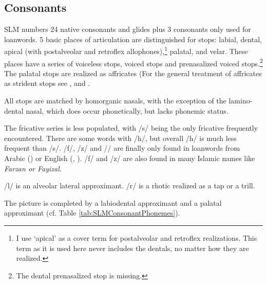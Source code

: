 
\subsection{Consonants}\label{sec:phon:Consonants}
SLM numbers 24 native consonants and glides plus 3 consonants only used for loanwords. 5 basic places of articulation are distinguished for stops: labial, dental, apical (with postalveolar and retroflex allophones),\footnote{I use `apical' as a cover term for  postalveolar and retroflex realizations. This term as it is used here never includes the dentals, no matter how they are realized.} palatal, and velar. These places have a series of voiceless stops, voiced stops and prenasalized voiced stops.\footnote{The dental prenasalized stop is missing.} The palatal stops are realized as affricates (For the general treatment of affricates as strident stops see \citet{JakobsonEtAl1952speechanalysis,Clements1999affr}, and \citet{Kehrein2002affr}.

All stops are matched by homorganic nasals, with the exception of the lamino-dental nasal, which does occur phonetically, but lacks phonemic status.

The fricative series is less populated, with /s/ being the only fricative frequently encountered. There are some words with /h/, but overall /h/ is much less frequent than /s/. /f/, /z/ and /\sh/ are finally only found in loanwords from Arabic () or English (, ). /f/ and /z/ are also found in many Islamic names like \em Farzan \em or \em Fayizal\em.

/l/ is an alveolar lateral approximant. /r/ is a rhotic realized as a tap or a trill.

The picture is completed by a labiodental approximant \V{} and a palatal approximant  (cf. Table \ref{tab:SLMConsonantPhonemes}).

